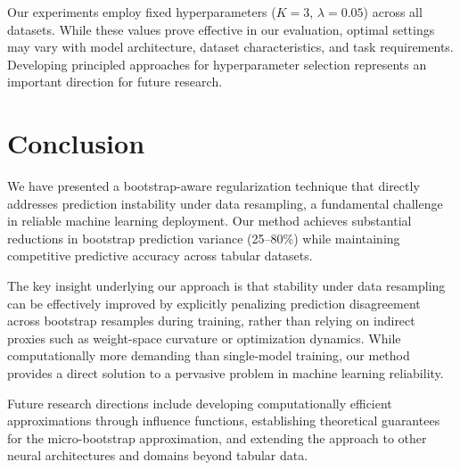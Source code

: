 \documentclass[12pt, letterpaper]{article}
\begin{document}
Our experiments employ fixed hyperparameters ($K=3$, $\lambda=0.05$) across all datasets. While these values prove effective in our evaluation, optimal settings may vary with model architecture, dataset characteristics, and task requirements. Developing principled approaches for hyperparameter selection represents an important direction for future research.

\section{Conclusion}

We have presented a bootstrap-aware regularization technique that directly addresses prediction instability under data resampling, a fundamental challenge in reliable machine learning deployment. Our method achieves substantial reductions in bootstrap prediction variance (25--80\%) while maintaining competitive predictive accuracy across tabular datasets.

The key insight underlying our approach is that stability under data resampling can be effectively improved by explicitly penalizing prediction disagreement across bootstrap resamples during training, rather than relying on indirect proxies such as weight-space curvature or optimization dynamics. While computationally more demanding than single-model training, our method provides a direct solution to a pervasive problem in machine learning reliability.

Future research directions include developing computationally efficient approximations through influence functions, establishing theoretical guarantees for the micro-bootstrap approximation, and extending the approach to other neural architectures and domains beyond tabular data.





\end{document}
